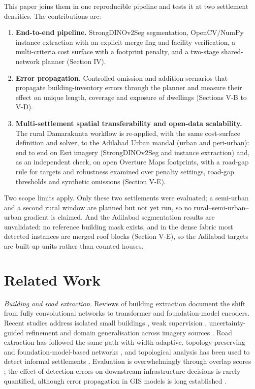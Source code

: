 \documentclass[journal]{IEEEtran}
\begin{document}
This paper joins them in one reproducible pipeline and tests it at two settlement densities. The contributions are:
\begin{enumerate}
\item \textbf{End-to-end pipeline.} StrongDINOv2Seg segmentation, OpenCV/NumPy instance extraction with an explicit merge flag and facility verification, a multi-criteria cost surface with a footprint penalty, and a two-stage shared-network planner (Section IV).
\item \textbf{Error propagation.} Controlled omission and addition scenarios that propagate building-inventory errors through the planner and measure their effect on unique length, coverage and exposure of dwellings (Sections V-B to V-D).
\item \textbf{Multi-settlement spatial transferability and open-data scalability.} The rural Damarakunta workflow is re-applied, with the same cost-surface definition and solver, to the Adilabad Urban mandal (urban and peri-urban): end to end on Esri imagery (StrongDINOv2Seg and instance extraction) and, as an independent check, on open Overture Maps footprints, with a road-gap rule for targets and robustness examined over penalty settings, road-gap thresholds and synthetic omissions (Section V-E).
\end{enumerate}

Two scope limits apply. Only these two settlements were evaluated; a semi-urban and a second rural window are planned but not yet run, so no rural--semi-urban--urban gradient is claimed. And the Adilabad segmentation results are unvalidated: no reference building mask exists, and in the dense fabric most detected instances are merged roof blocks (Section V-E), so the Adilabad targets are built-up units rather than counted houses.

\section{Related Work}

\textit{Building and road extraction.} Reviews of building extraction \cite{r01} document the shift from fully convolutional networks \cite{ji2019whu} to transformer and foundation-model encoders. Recent studies address isolated small buildings \cite{r63}, weak supervision \cite{r62}, uncertainty-guided refinement \cite{r64,r65} and domain generalisation across imagery sources \cite{r02,r66,r67,r68,r69,r70}. Road extraction has followed the same path with width-adaptive, topology-preserving and foundation-model-based networks \cite{r56,r57,r58,r59,r60}, and topological analysis has been used to detect informal settlements \cite{r48}. Evaluation is overwhelmingly through overlap scores \cite{foody2002status}; the effect of detection errors on downstream infrastructure decisions is rarely quantified, although error propagation in GIS models is long established \cite{heuvelink1998error}.
\end{document}
